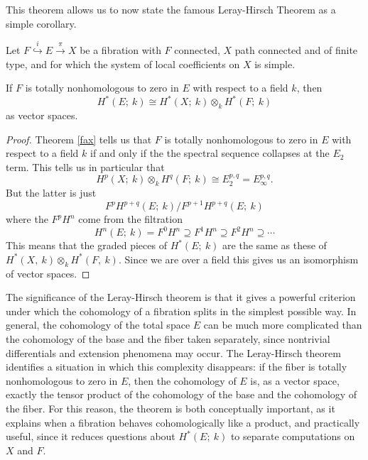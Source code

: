 This theorem allows us to now state the famous Leray-Hirsch Theorem as a simple corollary.

\begin{corollary}
    Let $F\overset{i}{\hookrightarrow} E \overset{\pi}{\longrightarrow}X$ be a fibration with $F$ connected, $X$ path connected and of finite type, and for which the system of local coefficients on $X$ is simple.

    If $F$ is totally nonhomologous to zero in $E$ with respect to a field $k$, then
    \begin{equation*}
        H^*(E;\ k) \cong H^*(X;\ k) \otimes_k H^*(F;\ k)
    \end{equation*}
    as vector spaces.
\end{corollary}
\begin{proof}
Theorem \ref{fax} tells us that $F$ is totally nonhomologous to zero in $E$ with respect to a field $k$ if and only if the the spectral sequence collapses at the $E_2$ term.   This tells us in particular that
\begin{equation*}
 H^p(X;\ k)\otimes_k H^q(F;\ k)\cong E_2^{p,q}=  E^{p,q}_\infty.
\end{equation*}
But the latter is just 
\begin{equation*}
    F^pH^{p+q}(E;\ k) / F^{p+1}H^{p+q}(E;\ k)
\end{equation*}
where the $F^pH^n$ come from the filtration
\begin{equation*}
    H^n(E;\ k)=F^0H^n \supseteq F^1H^n \supseteq F^2H^n \supseteq \cdots
\end{equation*}
This means that the graded pieces of $H^*(E;\ k)$ are the same as these of $H^*(X, \ k) \otimes_k H^*(F,\ k)$. Since we are over a field this gives us an isomorphism of vector spaces. 

\end{proof}

The significance of the Leray-Hirsch theorem is that it gives a powerful criterion under which the cohomology of a fibration splits in the simplest possible way. In general, the cohomology of the total space $E$ can be much more complicated than the cohomology of the base and the fiber taken separately, since nontrivial differentials and extension phenomena may occur. The Leray-Hirsch theorem identifies a situation in which this complexity disappears: if the fiber is totally nonhomologous to zero in $E$, then the cohomology of $E$ is, as a vector space, exactly the tensor product of the cohomology of the base and the cohomology of the fiber. For this reason, the theorem is both conceptually important, as it explains when a fibration behaves cohomologically like a product, and practically useful, since it reduces questions about $H^*(E; \ k)$ to separate computations on $X$ and $F$.

